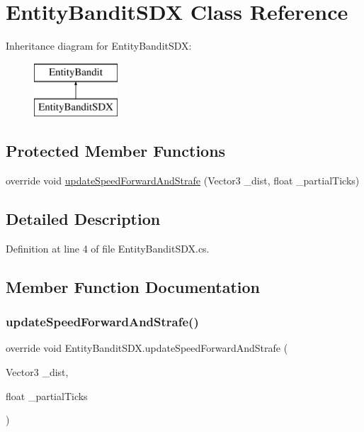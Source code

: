 \hypertarget{class_entity_bandit_s_d_x}{}\section{Entity\+Bandit\+S\+DX Class Reference}
\label{class_entity_bandit_s_d_x}
Inheritance diagram for Entity\+Bandit\+S\+DX\+:\begin{figure}[H]
\begin{center}
\leavevmode
\includegraphics[height=2.000000cm]{class_entity_bandit_s_d_x}
\end{center}
\end{figure}
\subsection*{Protected Member Functions}
\begin{DoxyCompactItemize}
\item 
override void \mbox{\hyperlink{class_entity_bandit_s_d_x_a22ad0f343b839f52f7c0c1c23db3ffc4}{update\+Speed\+Forward\+And\+Strafe}} (Vector3 \+\_\+dist, float \+\_\+partial\+Ticks)
\end{DoxyCompactItemize}


\subsection{Detailed Description}


Definition at line 4 of file Entity\+Bandit\+S\+D\+X.\+cs.



\subsection{Member Function Documentation}
\mbox{\label{class_entity_bandit_s_d_x_a22ad0f343b839f52f7c0c1c23db3ffc4}} 
\subsubsection{\texorpdfstring{updateSpeedForwardAndStrafe()}{updateSpeedForwardAndStrafe()}}
{\footnotesize\ttfamily override void Entity\+Bandit\+S\+D\+X.\+update\+Speed\+Forward\+And\+Strafe (\begin{DoxyParamCaption}\item[{Vector3}]{\+\_\+dist,  }\item[{float}]{\+\_\+partial\+Ticks }\end{DoxyParamCaption})\hspace{0.3cm}{\ttfamily [protected]}}



